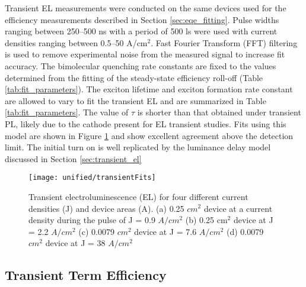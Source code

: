 \documentclass[../thesis.tex]{subfiles}
\begin{document}
Transient EL measurements were conducted on the same devices used for the efficiency measurements described in Section \ref{sec:eqe_fitting}. 
Pulse widths ranging between 250–500 ns with a period of 500 ls were used with current densities ranging between 0.5–50 A/cm$^2$. 
Fast Fourier Transform (FFT) filtering is used to remove experimental noise from the measured signal to increase fit accuracy. 
The bimolecular quenching rate constants are fixed to the values determined from the fitting of the steady-state efficiency roll-off (Table \ref{tab:fit_parameters}).
The exciton lifetime and exciton formation rate constant are allowed to vary to fit the transient EL and are summarized in Table \ref{tab:fit_parameters}.
The value of $\tau$ is shorter than that obtained under transient PL, likely due to the cathode present for EL transient studies.\supercite{Song2011}
Fits using this model are shown in Figure \ref{fig:transientFits} and show excellent agreement above the detection limit.  The initial turn on is well replicated by the luminance delay model discussed in Section \ref{sec:transient_el}


\begin{figure}[ht]
\centering
\texttt{[image: unified/transientFits]}
\caption{Transient electroluminescence (EL) for four different current densities (J) and device areas (A). (a) 0.25 $cm^2$ device at a current density during the pulse of J = 0.9 $A/cm^2$ (b) 0.25 cm$^2$
device at J = 2.2 $A/cm^2$ (c) 0.0079 $cm^2$ device at J = 7.6 $A/cm^2$ (d) 0.0079 $cm^2$ device at J = 38 $A/cm^2$}
\label{fig:transientFits}
\end{figure}


\subsection{Transient Term Efficiency}
\end{document}

